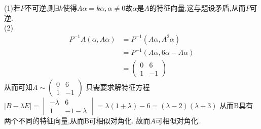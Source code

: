 \documentclass[12pt, a4paper, oneside, UTF8]{ctexbook}
\begin{document}
\begin{enumerate}
    \begin{solution}
    (1)若$P$不可逆,则$\exists k$使得$A\alpha=k\alpha,\alpha\neq 0$故$\alpha$是$A$的特征向量,这与题设矛盾,从而$P$可逆. \\
    (2) 
    \begin{align*}
        P^{-1}A(\alpha,A\alpha) &= P^{-1}(A\alpha,A^2\alpha) \\
        &= P^{-1}(A\alpha,6\alpha-A\alpha) \\
        &= \begin{pmatrix}
            0 & 6 \\
            1 & -1 
        \end{pmatrix}
    \end{align*}
    从而可知$A\sim \begin{pmatrix}
            0 & 6 \\
            1 & -1 
    \end{pmatrix}$ 只需要求解特征方程$\left|B-\lambda E\right|=\begin{vmatrix}
        -\lambda & 6 \\
        1 & -1-\lambda 
    \end{vmatrix}=\lambda(1+\lambda)-6=(\lambda-2)(\lambda+3)$ 从而B具有两个不同的特征向量,从而B可相似对角化. 
    故而$A$可相似对角化.
    \end{solution}
\end{enumerate}
\end{document}
